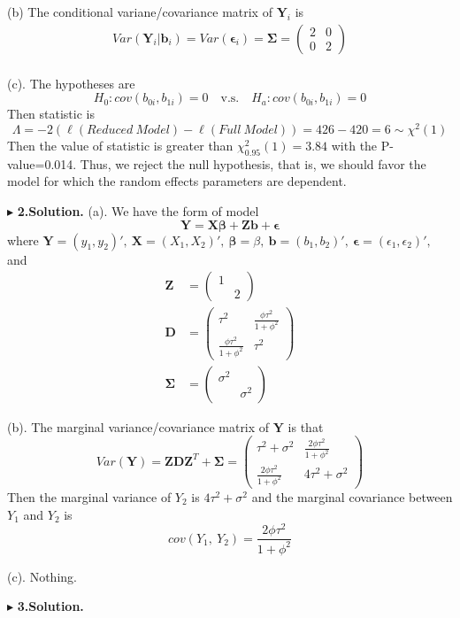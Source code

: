 \documentclass[letterpaper, 12pt]{article}
\newcommand{\ba}{$$\begin{aligned}}
\newcommand{\ea}{\end{aligned}$$}
\begin{document}
(b) The conditional variane/covariance matrix of $\bm{Y}_i$ is 
\ba
Var(\bm{Y}_i|\bm{b}_i)=Var(\bm{\epsilon}_i)=\bm{\Sigma}=\left(\begin{matrix}
2&0\\
0&2
\end{matrix}\right)\\
\ea

(c). The hypotheses are
$$
H_0:cov(b_{0i},b_{1i})=0\quad\text{v.s.}\quad H_a:cov(b_{0i},b_{1i})=0
$$
Then statistic is 
$$
\Lambda=-2(\ell(Reduced~Model)-\ell(Full~Model))=426-420=6\sim\chi^2(1)
$$
Then the value of statistic is greater than $\chi^2_{0.95}(1)=3.84$ with the P-value=0.014. Thus, we reject the null hypothesis, that is, we should favor the model for which the random effects parameters are dependent.



$\blacktriangleright$ \textbf{2.\quad Solution.} 
(a). We have the form of model 
$$
\bm{Y}=\bm{X}\bm{\beta}+\bm{Z}\bm{b}+\bm{\epsilon}
$$
where $
\bm{Y}=(y_1,y_2)',~
\bm{X}=(X_1,X_2)',~
\bm{\beta}=\beta,~
\bm{b}=(b_1,b_2)',~
\bm{\epsilon}=(\epsilon_1,\epsilon_2)',
$ and
\ba
\bm{Z}&=\left(\begin{matrix}
1\\
&2\end{matrix}\right)\\
\bm{D}&=\left(\begin{matrix}
\tau^2&\frac{\phi\tau^2}{1+\phi^2}\\
\frac{\phi\tau^2}{1+\phi^2}&\tau^2\end{matrix}\right)\\
\bm{\Sigma}&=\left(\begin{matrix}
\sigma^2\\
&\sigma^2\end{matrix}\right)
\ea


(b). The marginal variance/covariance matrix of $\bm{Y}$ is that
$$
Var(\bm{Y})=\bm{ZDZ}^T+\bm{\Sigma}=\left(\begin{matrix}
\tau^2+\sigma^2&\frac{2\phi\tau^2}{1+\phi^2}\\
\frac{2\phi\tau^2}{1+\phi^2}&4\tau^2+\sigma^2\end{matrix}\right)
$$
Then the marginal variance of $Y_2$ is $4\tau^2+\sigma^2$ and the marginal covariance between $Y_1$ and $Y_2$ is 
$$
cov(Y_1,~Y_2)=\frac{2\phi\tau^2}{1+\phi^2}
$$



(c). Nothing. 

$\blacktriangleright$ \textbf{3.\quad Solution.} 
\end{document}
